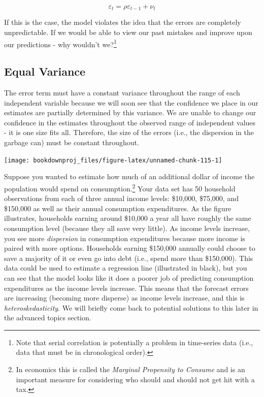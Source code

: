 \documentclass[
]{book}
\begin{document}
\[\varepsilon_t=\rho \varepsilon_{t-1}+\nu_t\]

If this is the case, the model violates the idea that the errors are completely unpredictable. If we would be able to view our past mistakes and improve upon our predictions - why wouldn't we?\footnote{Note that serial correlation is potentially a problem in time-series data (i.e., data that must be in chronological order).}

\hypertarget{equal-variance}{%
\subsection{Equal Variance}\label{equal-variance}}

The error term must have a constant variance throughout the range of each independent variable because we will soon see that the confidence we place in our estimates are partially determined by this variance. We are unable to change our confidence in the estimates throughout the observed range of independent values - it is one size fits all. Therefore, the size of the errors (i.e., the dispersion in the garbage can) must be constant throughout.

\begin{center}\texttt{[image: bookdownproj\_files/figure-latex/unnamed-chunk-115-1]} \end{center}

Suppose you wanted to estimate how much of an additional dollar of income the population would spend on consumption.\footnote{In economics this is called the \emph{Marginal Propensity to Consume} and is an important measure for considering who should and should not get hit with a tax.} Your data set has 50 household observations from each of three annual income levels: \$10,000, \$75,000, and \$150,000 as well as their annual consumption expenditures. As the figure illustrates, households earning around \$10,000 a year all have roughly the same consumption level (because they all save very little). As income levels increase, you see more \emph{dispersion} in consumption expenditures because more income is paired with more options. Households earning \$150,000 annually could choose to save a majority of it or even go into debt (i.e., spend more than \$150,000). This data could be used to estimate a regression line (illustrated in black), but you can see that the model looks like it does a poorer job of predicting consumption expenditures as the income levels increase. This means that the forecast errors are increasing (becoming more disperse) as income levels increase, and this is \emph{heteroskedasticity}. We will briefly come back to potential solutions to this later in the advanced topics section.
\end{document}
